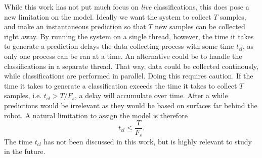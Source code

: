 While this work has not put much focus on \textit{live} classifications, this does pose a new limitation on the model. Ideally we want the system to collect $T$ samples, and make an instantaneous prediction so that $T$ new samples can be collected right away. By running the system on a single thread, however, the time it takes to generate a prediction delays the data collecting process with some time $t_{cl}$, as only one process can be ran at a time. An alternative could be to handle the classifications in a separate thread. That way, data could be collected continously, while classifications are performed in parallel. Doing this requires caution. If the time it takes to generate a classification exceeds the time it takes to collect $T$ samples, i.e. $t_{cl}>T/F_s$, a delay will accumulate over time. After a while predictions would be irrelevant as they would be based on surfaces far behind the robot. A natural limitation to assign the model is therefore
\begin{equation}
	t_{cl} \le \frac{T}{F_s}.
\end{equation}
The time $t_{cl}$ has not been discussed in this work, but is highly relevant to study in the future.





